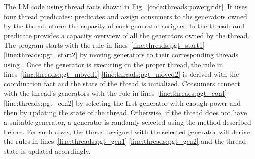 The LM code using thread facts shown in Fig.~\ref{code:threads:powergridt}. It
uses four thread predicates: predicates  and
 assign consumers to the generators owned by the
thread;  stores the capacity of each generator assigned to
the thread; and predicate  provides a capacity
overview of all the generators owned by the thread.  The program starts with the
rule in lines~\ref{line:threads:pgt_start1}-\ref{line:threads:pgt_start2} by
moving generators to their corresponding threads using . Once
the generator is executing on the proper thread, the rule in
lines~\ref{line:threads:pgt_moved1}-\ref{line:threads:pgt_moved2} is derived
with the  coordination fact and the state of the thread is
initialized. Consumers connect with the thread's generators with the rule in
lines~\ref{line:threads:pgt_con1}-\ref{line:threads:pgt_con2} by selecting the
first generator with enough power and then by updating the state of the thread.
Otherwise, if the thread does not have a suitable generator, a generator is
randomly selected using the method described before. For such cases, the thread
assigned with the selected generator will derive the rules in
lines~\ref{line:threads:pgt_gen1}-\ref{line:threads:pgt_gen2} and the thread
state is updated accordingly.

